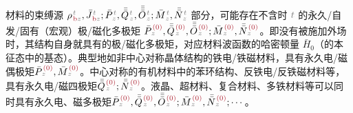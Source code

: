 材料的束缚源 ${\rho}^{\;\!\mathcolor{gray}{t}}_{\;\!\textcolor{Maroon}{\text{b}}\mathcolor{gray}{z}}, \bar{J}^{\;\!\mathcolor{gray}{t}}_{\;\!\textcolor{Maroon}{\text{b}}\mathcolor{gray}{z}};\bar{P}^{\;\!\mathcolor{gray}{t}}_{\;\!\mathcolor{gray}{z}},\bar{\bar{Q}}^{\;\!\mathcolor{gray}{t}}_{\;\!\mathcolor{gray}{z}},\bar{\bar{\bar{O}}}^{\;\!\mathcolor{gray}{t}}_{\;\!\mathcolor{gray}{z}} ; \bar{M}^{\;\!\mathcolor{gray}{t}}_{\;\!\mathcolor{gray}{z}}, \bar{\bar{N}}^{\;\!\mathcolor{gray}{t}}_{\;\!\mathcolor{gray}{z}}$ 部分，可能存在不含时 $\mathcolor{gray}{t}$ 的永久/自发/固有（宏观）极/磁化多极矩 $\bar{P}^{\;\!\textcolor{Maroon}{(0)}}_{\;\!\mathcolor{gray}{z}},\bar{\bar{Q}}^{\;\!\textcolor{Maroon}{(0)}}_{\;\!\mathcolor{gray}{z}},\bar{\bar{\bar{O}}}^{\;\!\textcolor{Maroon}{(0)}}_{\;\!\mathcolor{gray}{z}} ; \bar{M}^{\;\!\textcolor{Maroon}{(0)}}_{\;\!\mathcolor{gray}{z}}, \bar{\bar{N}}^{\;\!\textcolor{Maroon}{(0)}}_{\;\!\mathcolor{gray}{z}}$。即没有被施加外场时，其结构自身就具有的极/磁化多极矩，对应材料波函数的哈密顿量 $\bar{H}_0$（的本征态中的基态）。典型地如非中心对称晶体结构的铁电/铁磁材料，具有永久电/磁偶极矩$\bar{P}^{\;\!\textcolor{Maroon}{(0)}}_{\;\!\mathcolor{gray}{z}}, \bar{M}^{\;\!\textcolor{Maroon}{(0)}}_{\;\!\mathcolor{gray}{z}}$。中心对称的有机材料中的苯环结构、反铁电/反铁磁材料等，具有永久电/磁四极矩$\bar{\bar{Q}}^{\;\!\textcolor{Maroon}{(0)}}_{\;\!\mathcolor{gray}{z}};\bar{\bar{N}}^{\;\!\textcolor{Maroon}{(0)}}_{\;\!\mathcolor{gray}{z}}$。液晶、超材料、复合材料、多铁材料等可以同时具有永久电、磁多极矩$\bar{P}^{\;\!\textcolor{Maroon}{(0)}}_{\;\!\mathcolor{gray}{z}},\bar{\bar{Q}}^{\;\!\textcolor{Maroon}{(0)}}_{\;\!\mathcolor{gray}{z}},\bar{\bar{\bar{O}}}^{\;\!\textcolor{Maroon}{(0)}}_{\;\!\mathcolor{gray}{z}} ; \bar{M}^{\;\!\textcolor{Maroon}{(0)}}_{\;\!\mathcolor{gray}{z}}, \bar{\bar{N}}^{\;\!\textcolor{Maroon}{(0)}}_{\;\!\mathcolor{gray}{z}}; \cdots$。

